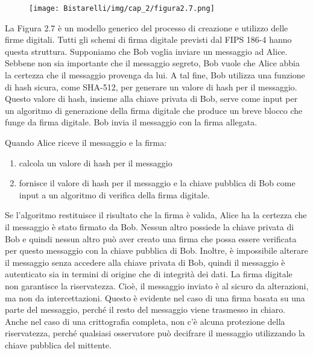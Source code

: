 \begin{figure}[H]
	\centering
    \texttt{[image: Bistarelli/img/cap\_2/figura2.7.png]}
\end{figure}


La Figura 2.7 è un modello generico del processo di creazione e utilizzo delle firme digitali. Tutti gli schemi di firma digitale previsti dal FIPS 186-4 hanno questa struttura. Supponiamo che Bob voglia inviare un messaggio ad Alice. Sebbene non sia importante che il messaggio segreto, Bob vuole che Alice abbia la certezza che il messaggio provenga da lui. A tal fine, Bob utilizza una funzione di hash sicura, come SHA-512, per generare un valore di hash per il messaggio. Questo valore di hash, insieme alla chiave privata di Bob, serve come input per un algoritmo di generazione della firma digitale che produce un breve blocco che funge da firma digitale. Bob invia il messaggio con la firma allegata.

\singlespacing

Quando Alice riceve il messaggio e la firma:

\begin{enumerate}
    \item calcola un valore di hash per il messaggio
    
    \item fornisce il valore di hash per il messaggio e la chiave pubblica di Bob come input a un algoritmo di verifica della firma digitale.
\end{enumerate}

Se l'algoritmo restituisce il risultato che la firma è valida, Alice ha la certezza che il messaggio è stato firmato da Bob. Nessun altro possiede la chiave privata di Bob e quindi nessun altro può aver creato una firma che possa essere verificata per questo messaggio con la chiave pubblica di Bob. Inoltre, è impossibile alterare il messaggio senza accedere alla chiave privata di Bob, quindi il messaggio è autenticato sia in termini di origine che di integrità dei dati. La firma digitale non garantisce la riservatezza. Cioè, il messaggio inviato  è al sicuro da alterazioni, ma non da intercettazioni. Questo è evidente nel caso di una firma basata su una parte del messaggio, perché il resto del messaggio viene trasmesso in chiaro. Anche nel caso di una crittografia completa, non c'è alcuna protezione della riservatezza, perché qualsiasi osservatore può decifrare il messaggio utilizzando la chiave pubblica del mittente. 


